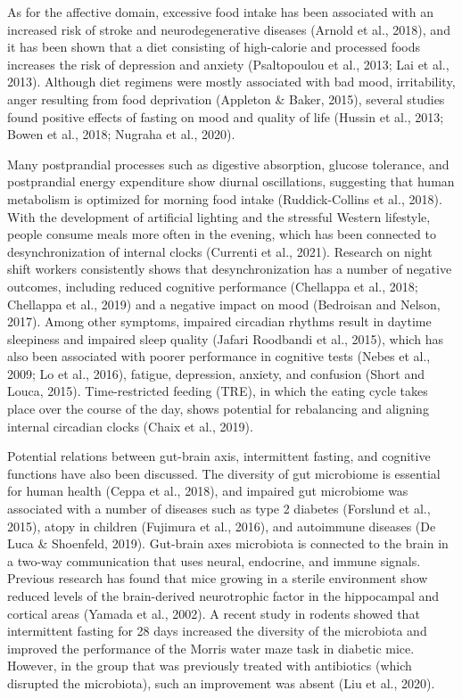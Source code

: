 \documentclass[authordate, empirical]{jote-new-article}
\begin{document}
As for the affective domain, excessive food intake has been associated with an increased risk of stroke and neurodegenerative diseases (Arnold et al., 2018), and it has been shown that a diet consisting of high-calorie and processed foods increases the risk of depression and anxiety (Psaltopoulou et al., 2013; Lai et al., 2013). Although diet regimens were mostly associated with bad mood, irritability, anger resulting from food deprivation (Appleton \& Baker, 2015), several studies found positive effects of fasting on mood and quality of life (Hussin et al., 2013; Bowen et al., 2018; Nugraha et al., 2020).



Many postprandial processes such as digestive absorption, glucose tolerance, and postprandial energy expenditure show diurnal oscillations, suggesting that human metabolism is optimized for morning food intake (Ruddick-Collins et al., 2018). With the development of artificial lighting and the stressful Western lifestyle, people consume meals more often in the evening, which has been connected to desynchronization of internal clocks (Currenti et al., 2021). Research on night shift workers consistently shows that desynchronization has a number of negative outcomes, including reduced cognitive performance (Chellappa et al., 2018; Chellappa et al., 2019) and a negative impact on mood (Bedroisan and Nelson, 2017). Among other symptoms, impaired circadian rhythms result in daytime sleepiness and impaired sleep quality (Jafari Roodbandi et al., 2015), which has also been associated with poorer performance in cognitive tests (Nebes et al., 2009; Lo et al., 2016), fatigue, depression, anxiety, and confusion (Short and Louca, 2015). Time-restricted feeding (TRE), in which the eating cycle takes place over the course of the day, shows potential for rebalancing and aligning internal circadian clocks (Chaix et al., 2019).



Potential relations between gut-brain axis, intermittent fasting, and cognitive functions have also been discussed. The diversity of gut microbiome is essential for human health (Ceppa et al., 2018), and impaired gut microbiome was associated with a number of diseases such as type 2 diabetes (Forslund et al., 2015), atopy in children (Fujimura et al., 2016), and autoimmune diseases (De Luca \& Shoenfeld, 2019). Gut-brain axes microbiota is connected to the brain in a two-way communication that uses neural, endocrine, and immune signals. Previous research has found that mice growing in a sterile environment show reduced levels of the brain-derived neurotrophic factor in the hippocampal and cortical areas (Yamada et al., 2002). A recent study in rodents showed that intermittent fasting for 28 days increased the diversity of the microbiota and improved the performance of the Morris water maze task in diabetic mice. However, in the group that was previously treated with antibiotics (which disrupted the microbiota), such an improvement was absent (Liu et al., 2020).
\end{document}
